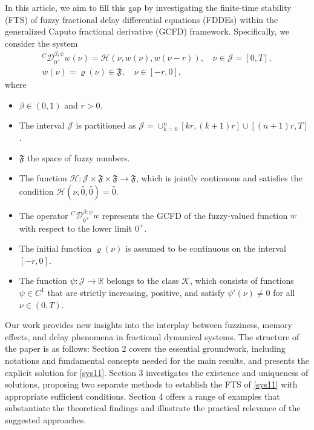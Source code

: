 \documentclass[10pt,a4paper]{amsart}
\numberwithin{equation}{section}
\begin{document}
In this article, we aim to fill this gap by investigating the finite-time stability
(FTS) of fuzzy fractional delay differential equations (FDDEs) within the generalized
Caputo fractional derivative (GCFD) framework.
Specifically, we consider the system
\begin{equation} \label{sys11}
\begin{gathered}
{}^C \mathcal{D}_{0^{+}}^{\beta ; \psi} w(\nu )=\mathcal{H}(\nu , w(\nu ),
 w(\nu - r)),\quad \nu \in \mathcal{J}=[0, T], \\
 w(\nu )=\varrho(\nu ) \in \mathfrak{F}, \quad \nu \in[- r, 0],
\end{gathered}
\end{equation}
where
\begin{itemize}
\item $\beta \in (0,1)$ and $r> 0$.

\item The interval $\mathcal{J}$ is partitioned as $\mathcal{J}
= \cup_{k=0}^{n} [k r, (k+1) r] \cup [(n+1) r, T]$.

\item $\mathfrak{F}$ the space of fuzzy numbers.

\item The function
$\mathcal{H} : \mathcal{J} \times \mathfrak{F} \times \mathfrak{F} \to \mathfrak{F}$,
which is jointly continuous and satisfies the condition $\mathcal{H}(\nu , \hat{0},
\hat{0}) = \hat{0}$.

\item The operator ${}^C \mathcal{D}_{0^{+}}^{\beta;\psi} w$ represents the
 GCFD of the fuzzy-valued function $ w$ with respect to the lower limit $0^+$.

\item The initial function $\varrho(\nu )$ is assumed to be continuous on the
interval $[-r, 0]$.

\item The function $\psi : \mathcal{J} \to \mathbb{R}$ belongs to the class
$\mathcal{K}$, which consists of functions $\psi \in C^1$ that are strictly
increasing, positive, and satisfy $\psi'(\nu ) \neq 0$ for all $\nu \in (0, T)$.
\end{itemize}

Our work provides new insights into the interplay between fuzziness, memory effects,
and delay phenomena in fractional dynamical systems.
The structure of the paper is as follows:
Section 2 covers the essential groundwork, including notations and fundamental concepts
needed for the main results, and presents the explicit solution for \eqref{sys11}.
Section 3 investigates the existence and uniqueness of solutions, proposing two
separate methods to establish the FTS of \eqref{sys11} with appropriate sufficient
conditions.
Section 4 offers a range of examples that substantiate the theoretical findings
and illustrate the practical relevance of the suggested approaches.
\end{document}
